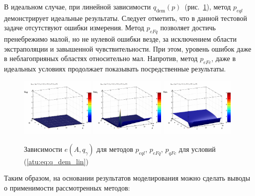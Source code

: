 В идеальном случае, при линейной зависимости $q_\mathrm{dem}(p)$~(рис.~\ref{atu:f:qsl_pe_A_qg_lin}),
метод $p_{eql}$ демонстрирует идеальные результаты.
Следует отметить, что в данной тестовой задаче отсутствуют
ошибки измерения.
Метод $p_{eFq}$ позволяет достичь пренебрежимо малой, но не нулевой
ошибки везде, за исключением области экстраполяции и завышенной чувствительности.
При этом, уровень ошибок даже в неблагоприяных областях
относительно мал. Напротив, метод $p_{eFc}$,
даже в идеальных условиях продолжает показывать
посредственные результаты.

\begin{figure}[htb!]
  \centerline{
    \includegraphics[width=0.32\textwidth]{p/qls_pe-p_A_qg_eql_lin.png}
    \hfill
    \includegraphics[width=0.32\textwidth]{p/qls_pe-p_A_qg_eFq_lin.png}
    \hfill
    \includegraphics[width=0.32\textwidth]{p/qls_pe-p_A_qg_eFc_lin.png}
  }
  \caption{Зависимости $e(A,q_\gamma)$ для методов $p_{eql}$, $p_{eFq}$, $p_{qFc}$ для условий (\ref{atu:eq:q_dem_lin})}
  \label{atu:f:qsl_pe_A_qg_lin}
\end{figure}

Таким образом, на основании результатов моделирования
можно сделать выводы о применимости рассмотренных методов:

